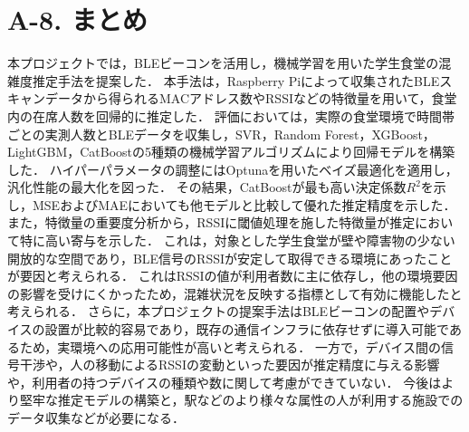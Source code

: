 \section*{A-8. まとめ}

本プロジェクトでは，BLEビーコンを活用し，機械学習を用いた学生食堂の混雑度推定手法を提案した．
本手法は，Raspberry Piによって収集されたBLEスキャンデータから得られるMACアドレス数やRSSIなどの特徴量を用いて，食堂内の在席人数を回帰的に推定した．
評価においては，実際の食堂環境で時間帯ごとの実測人数とBLEデータを収集し，SVR，Random Forest，XGBoost，LightGBM，CatBoostの5種類の機械学習アルゴリズムにより回帰モデルを構築した．
ハイパーパラメータの調整にはOptunaを用いたベイズ最適化を適用し，汎化性能の最大化を図った．
その結果，CatBoostが最も高い決定係数$R^2$を示し，MSEおよびMAEにおいても他モデルと比較して優れた推定精度を示した．
また，特徴量の重要度分析から，RSSIに閾値処理を施した特徴量が推定において特に高い寄与を示した．
これは，対象とした学生食堂が壁や障害物の少ない開放的な空間であり，BLE信号のRSSIが安定して取得できる環境にあったことが要因と考えられる．
これはRSSIの値が利用者数に主に依存し，他の環境要因の影響を受けにくかったため，混雑状況を反映する指標として有効に機能したと考えられる．
さらに，本プロジェクトの提案手法はBLEビーコンの配置やデバイスの設置が比較的容易であり，既存の通信インフラに依存せずに導入可能であるため，実環境への応用可能性が高いと考えられる．
一方で，デバイス間の信号干渉や，人の移動によるRSSIの変動といった要因が推定精度に与える影響や，利用者の持つデバイスの種類や数に関して考慮ができていない．
今後はより堅牢な推定モデルの構築と，駅などのより様々な属性の人が利用する施設でのデータ収集などが必要になる．
